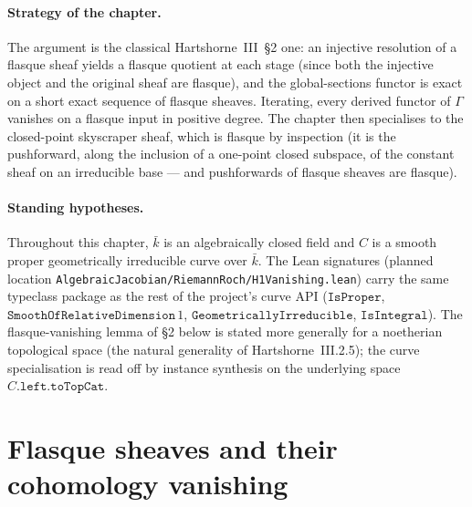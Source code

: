 \paragraph{Strategy of the chapter.} The argument is the classical
Hartshorne~III~\S2 one: an injective resolution of a flasque sheaf
yields a flasque quotient at each stage (since both the injective object
and the original sheaf are flasque), and the global-sections functor is
exact on a short exact sequence of flasque sheaves. Iterating, every
derived functor of \(\Gamma\) vanishes on a flasque input in positive
degree. The chapter then specialises to the closed-point skyscraper
sheaf, which is flasque by inspection (it is the pushforward, along the
inclusion of a one-point closed subspace, of the constant sheaf on an
irreducible base — and pushforwards of flasque sheaves are flasque).

\paragraph{Standing hypotheses.} Throughout this chapter, \(\bar k\) is
an algebraically closed field and \(C\) is a smooth proper geometrically
irreducible curve over \(\bar k\). The Lean signatures (planned location
\texttt{AlgebraicJacobian/RiemannRoch/H1Vanishing.lean}) carry the same
typeclass package as the rest of the project's curve API
(\(\mathtt{IsProper}\), \(\mathtt{SmoothOfRelativeDimension}\, 1\),
\(\mathtt{GeometricallyIrreducible}\), \(\mathtt{IsIntegral}\)). The
flasque-vanishing lemma of \S2 below is stated more generally for a
noetherian topological space (the natural generality of
Hartshorne~III.2.5); the curve specialisation is read off by instance
synthesis on the underlying space \(C.\mathtt{left.toTopCat}\).

\section{Flasque sheaves and their cohomology vanishing}
\label{sec:H1Vanishing_flasque}

